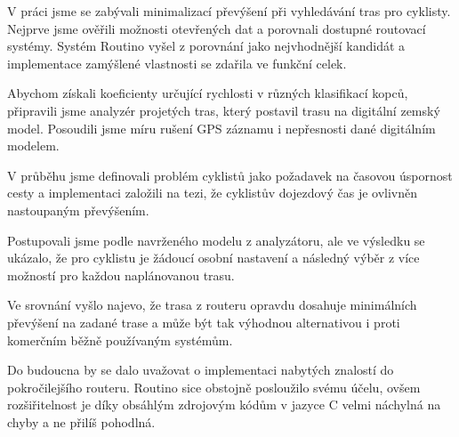 \documentclass[thesis=B,czech]{FITthesis}[2012/06/26]
\begin{document}
\begin{conclusion}


V práci jsme se zabývali minimalizací převýšení při vyhledávání tras pro cyklisty. Nejprve jsme ověřili možnosti otevřených dat a porovnali dostupné routovací systémy. Systém Routino vyšel z porovnání jako nejvhodnější kandidát a implementace zamýšlené vlastnosti se zdařila ve funkční celek.

Abychom získali koeficienty určující rychlosti v různých klasifikací kopců, připravili jsme analyzér projetých tras, který postavil trasu na digitální zemský model. Posoudili jsme míru rušení GPS záznamu i nepřesnosti dané digitálním modelem.

V průběhu jsme definovali problém cyklistů jako požadavek na časovou úspornost cesty a implementaci založili na tezi, že cyklistův dojezdový čas je ovlivněn nastoupaným převýšením.

Postupovali jsme podle navrženého modelu z analyzátoru, ale ve výsledku se ukázalo, že pro cyklistu je žádoucí osobní nastavení a následný výběr z více možností pro každou naplánovanou trasu.

Ve srovnání vyšlo najevo, že trasa z routeru opravdu dosahuje minimálních převýšení na zadané trase a může být tak výhodnou alternativou i proti komerčním běžně používaným systémům.

Do budoucna by se dalo uvažovat o implementaci nabytých znalostí do pokročilejšího routeru. Routino sice obstojně posloužilo svému účelu, ovšem rozšiřitelnost je díky obsáhlým zdrojovým kódům v jazyce C velmi náchylná na chyby a ne přilíš pohodlná.


\end{conclusion}















\appendix
\end{document}

